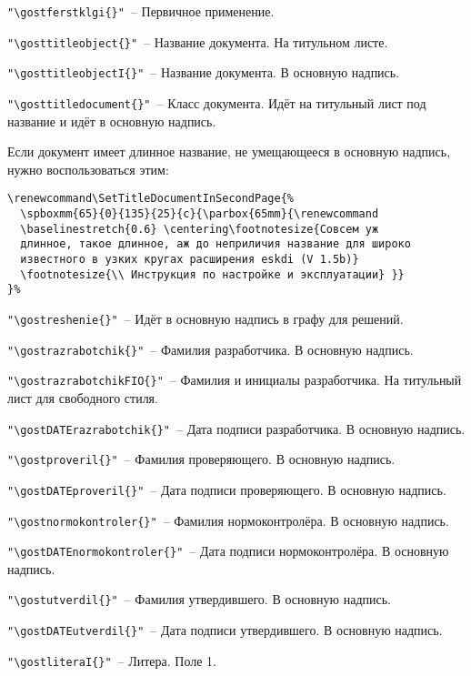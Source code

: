\noindent \verb|"\gostferstklgi{}"|~– Первичное применение.

\noindent \verb|"\gosttitleobject{}"|~– Название документа. На титульном листе.

\noindent \verb|"\gosttitleobjectI{}"|~– Название документа. В основную надпись.

\noindent \verb|"\gosttitledocument{}"|~– Класс документа. Идёт на титульный лист под название и идёт в основную надпись.

Если документ имеет длинное название, не умещающееся в основную надпись, нужно воспользоваться этим:

\begin{Verbatim}[frame=single]
% Раскомментировать если совсем уж длинное название документа
\renewcommand\SetTitleDocumentInSecondPage{%
  \spboxmm{65}{0}{135}{25}{c}{\parbox{65mm}{\renewcommand
  \baselinestretch{0.6} \centering\footnotesize{Совсем уж 
  длинное, такое длинное, аж до неприличия название для широко 
  известного в узких кругах расширения eskdi (V 1.5b)} 
  \footnotesize{\\ Инструкция по настройке и эксплуатации} }}
}%
\end{Verbatim}


\noindent \verb|"\gostreshenie{}"|~– Идёт в основную надпись в графу для решений.

\noindent \verb|"\gostrazrabotchik{}"|~– Фамилия разработчика. В основную надпись.

\noindent \verb|"\gostrazrabotchikFIO{}"|~– Фамилия и инициалы разработчика. На титульный лист для свободного стиля.

\noindent \verb|"\gostDATErazrabotchik{}"|~– Дата подписи разработчика. В основную надпись.

\noindent \verb|"\gostproveril{}"|~– Фамилия проверяющего. В основную надпись.

\noindent \verb|"\gostDATEproveril{}"|~– Дата подписи проверяющего. В основную надпись.
  
\noindent \verb|"\gostnormokontroler{}"|~– Фамилия нормоконтролёра. В основную надпись.

\noindent \verb|"\gostDATEnormokontroler{}"|~– Дата подписи нормоконтролёра. В основную надпись.

\noindent \verb|"\gostutverdil{}"|~– Фамилия утвердившего. В основную надпись.

\noindent \verb|"\gostDATEutverdil{}"|~– Дата подписи утвердившего. В основную надпись.
  
\noindent \verb|"\gostliteraI{}"|~– Литера. Поле 1.

